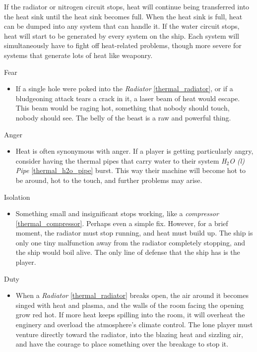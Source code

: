 \documentclass[a4paper]{article}
\begin{document}
If the radiator or nitrogen circuit stops, heat will continue being transferred into the heat sink until the heat sink becomes full. When the heat sink is full, heat can be dumped into any system that can handle it. If the water circuit stops, heat will start to be generated by every system on the ship. Each system will simultaneously have to fight off heat-related problems, though more severe for systems that generate lots of heat like weaponry.

\vspace{0.3cm}
\begin{minipage}[t]{0.4\linewidth}
Fear
\begin{itemize}
\item If a single hole were poked into the \textit{Radiator} \ref{thermal_radiator}, or if a bludgeoning attack tears a crack in it, a laser beam of heat would escape. This beam would be raging hot, something that nobody should touch, nobody should see. The belly of the beast is a raw and powerful thing.
\end{itemize}
\end{minipage} 
\begin{minipage}[t]{0.4\linewidth}
Anger
\begin{itemize}
\item Heat is often synonymous with anger. If a player is getting particularly angry, consider having the thermal pipes that carry water to their system \textit{H$_2$O (l) Pipe} \ref{thermal_h2o_pipe} burst. This way their machine will become hot to be around, hot to the touch, and further problems may arise. 
\end{itemize}
\end{minipage}

\begin{minipage}[t]{0.4\linewidth}
Isolation
\begin{itemize}
\item Something small and insignificant stops working, like a \textit{compressor} \ref{thermal_compressor}. Perhaps even a simple fix. However, for a brief moment, the radiator must stop running, and heat must build up. The ship is only one tiny malfunction away from the radiator completely stopping, and the ship would boil alive. The only line of defense that the ship has is the player.
\end{itemize}
\end{minipage}
\begin{minipage}[t]{0.4\linewidth}
Duty
\begin{itemize}
\item When a \textit{Radiator} \ref{thermal_radiator} breaks open, the air around it becomes singed with heat and plasma, and the walls of the room facing the opening grow red hot. If more heat keeps spilling into the room, it will overheat the enginery and overload the atmosphere's climate control. The lone player must venture directly toward the radiator, into the blazing heat and sizzling air, and have the courage to place something over the breakage to stop it.
\end{itemize}
\end{minipage}
\end{document}
